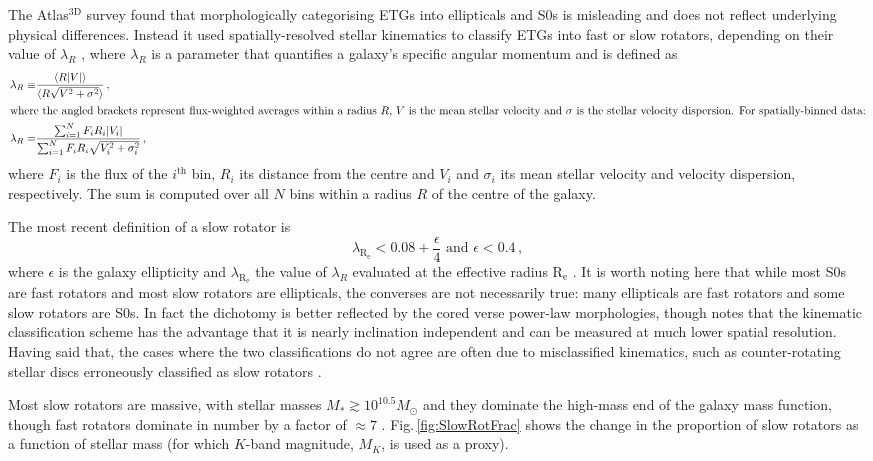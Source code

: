 	The Atlas$^\text{3D}$ survey \citep{Cappellari2011} found that morphologically categorising ETGs into ellipticals and S0s is misleading and does not reflect underlying physical differences. Instead it used spatially-resolved stellar kinematics to classify ETGs into fast or slow rotators, depending on their value of $\lambda_R$ \citep{Emsellem2011}, where $\lambda_R$ is a parameter that quantifies a galaxy's specific angular momentum and is defined as
	\begin{align}
		\lambda_R \equiv & \frac{\langle R |V|\rangle}{\langle R \sqrt{V^2 + \sigma^2}\rangle} \, ,\\
		\intertext{where the angled brackets represent flux-weighted averages within a radius $R$, $V$ is the mean stellar velocity and $\sigma$ is the stellar velocity dispersion. For spatially-binned data:}
		\lambda_R = & \frac{\sum_{i=1}^{N} F_i R_i |V_i|}{\sum_{i=1}^{N} F_i R_i \sqrt{V_i^2 + \sigma_i^2}} \, ,
	\end{align}
	where $F_i$ is the flux of the $i^\text{th}$ bin, $R_i$ its distance from the centre and $V_i$ and $\sigma_i$ its mean stellar velocity and velocity dispersion, respectively. The sum is computed over all $N$ bins within a radius $R$ of the centre of the galaxy.

	The most recent definition of a slow rotator is
	\begin{equation}
		\lambda_\mathrm{R_e} < 0.08 + \frac{\epsilon}{4} \text{    and    } \epsilon < 0.4 \, ,
	\end{equation}
	where $\epsilon$ is the galaxy ellipticity and $\lambda_\mathrm{R_e}$ the value of $\lambda_R$ evaluated at the effective radius $\mathrm{R_e}$ \citep{Cappellari2016}. %
	It is worth noting here that while most S0s are fast rotators and most slow rotators are ellipticals, the converses are not necessarily true: many ellipticals are fast rotators and some slow rotators are S0s. In fact the dichotomy is better reflected by the cored verse power-law morphologies, though \citet{Cappellari2016} notes that the kinematic classification scheme has the advantage that it is nearly inclination independent and can be measured at much lower spatial resolution. Having said that, the cases where the two classifications do not agree are often due to misclassified kinematics, such as counter-rotating stellar discs erroneously classified as slow rotators \citep[e.g.][]{Pinkney2003, Cappellari2005, Cappellari2007}. 

	Most slow rotators are massive, with stellar masses $M_\ast \gtrsim 10^{10.5} M_\odot$ and they dominate the high-mass end of the galaxy mass function, though fast rotators dominate in number by a factor of $\approx 7$ \citep[e.g.][]{Emsellem2011, Veale2017}. Fig.\,\ref{fig:SlowRotFrac} shows the change in the proportion of slow rotators as a function of stellar mass (for which $K$-band magnitude, $M_K$, is used as a proxy).


